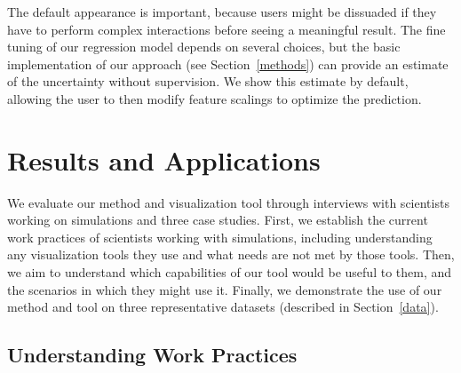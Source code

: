 The default appearance is important, because users might be dissuaded if they have to perform complex interactions before seeing a meaningful result. The fine tuning of our regression model depends on several choices, but the basic implementation of our approach (see Section~\ref{methods}) can provide an estimate of the uncertainty without supervision. We show this estimate by default, allowing the user to then modify feature scalings to optimize the prediction.





\section{Results and Applications}
We evaluate our method and visualization tool through interviews with scientists working on simulations and three case studies. First, we establish the current work practices of scientists working with simulations, including understanding any visualization tools they use and what needs are not met by those tools. Then, we aim to understand which capabilities of our tool would be useful to them, and the scenarios in which they might use it. Finally, we demonstrate the use of our method and tool on three representative datasets (described in Section~\ref{data}).




\subsection{Understanding Work Practices}
\label{uwp}


